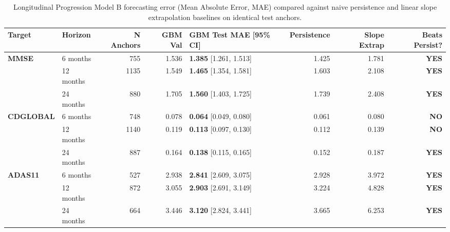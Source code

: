\begin{table}[t]
\centering
\caption{Longitudinal Progression Model B forecasting error (Mean Absolute Error, MAE) compared against naive persistence and linear slope extrapolation baselines on identical test anchors.}
\label{tab:forecast_mae}
\small
\begin{adjustbox}{max width=\linewidth}
\begin{tabular}{llrrlrrr}
\toprule
\textbf{Target} & \textbf{Horizon} & \textbf{N Anchors} & \textbf{GBM Val} & \textbf{GBM Test MAE [95\% CI]} & \textbf{Persistence} & \textbf{Slope Extrap} & \textbf{Beats Persist?} \\
\midrule
\textbf{MMSE} & 6 months  & 755  & 1.536 & \textbf{1.385} [1.261, 1.513] & 1.425 & 1.781 & \textbf{YES} \\
              & 12 months & 1135 & 1.549 & \textbf{1.465} [1.354, 1.581] & 1.603 & 2.108 & \textbf{YES} \\
              & 24 months & 880  & 1.705 & \textbf{1.560} [1.403, 1.725] & 1.739 & 2.408 & \textbf{YES} \\
\midrule
\textbf{CDGLOBAL} & 6 months  & 748  & 0.078 & \textbf{0.064} [0.049, 0.080] & 0.061 & 0.080 & \textbf{NO} \\
                  & 12 months & 1140 & 0.119 & \textbf{0.113} [0.097, 0.130] & 0.112 & 0.139 & \textbf{NO} \\
                  & 24 months & 887  & 0.164 & \textbf{0.138} [0.115, 0.165] & 0.152 & 0.187 & \textbf{YES} \\
\midrule
\textbf{ADAS11} & 6 months  & 527  & 2.938 & \textbf{2.841} [2.609, 3.075] & 2.928 & 3.972 & \textbf{YES} \\
                & 12 months & 872  & 3.055 & \textbf{2.903} [2.691, 3.149] & 3.224 & 4.828 & \textbf{YES} \\
                & 24 months & 664  & 3.446 & \textbf{3.120} [2.824, 3.441] & 3.665 & 6.253 & \textbf{YES} \\
\bottomrule
\end{tabular}
\end{adjustbox}
\end{table}
